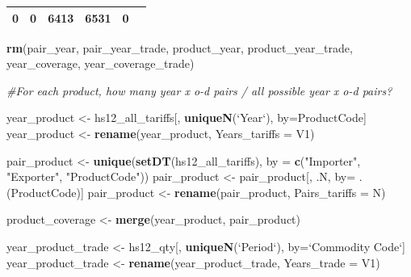 \documentclass[10pt,]{article}
\newenvironment{Shaded}{\begin{snugshade}}{\end{snugshade}}
\newcommand{\KeywordTok}[1]{\textcolor[rgb]{0.13,0.29,0.53}{\textbf{{#1}}}}
\newcommand{\DataTypeTok}[1]{\textcolor[rgb]{0.13,0.29,0.53}{{#1}}}
\newcommand{\StringTok}[1]{\textcolor[rgb]{0.31,0.60,0.02}{{#1}}}
\newcommand{\CommentTok}[1]{\textcolor[rgb]{0.56,0.35,0.01}{\textit{{#1}}}}
\newcommand{\NormalTok}[1]{{#1}}
\begin{document}
\begin{longtable}[]{@{}cccccc@{}}
\begin{minipage}[t]{0.19\columnwidth}
0\strut
\end{minipage} & \begin{minipage}[t]{0.16\columnwidth}\centering\strut
0\strut
\end{minipage} & \begin{minipage}[t]{0.17\columnwidth}\centering\strut
6413\strut
\end{minipage} & \begin{minipage}[t]{0.14\columnwidth}\centering\strut
6531\strut
\end{minipage} & \begin{minipage}[t]{0.10\columnwidth}\centering\strut
0\strut
\end{minipage}\tabularnewline
\bottomrule
\end{longtable}

\begin{Shaded}
\begin{Highlighting}[]
\KeywordTok{rm}\NormalTok{(pair_year, pair_year_trade, product_year, product_year_trade, year_coverage, year_coverage_trade)}

\CommentTok{#For each product, how many year x o-d pairs / all possible year x o-d pairs?}

\NormalTok{year_product <-}\StringTok{ }\NormalTok{hs12_all_tariffs[, }\KeywordTok{uniqueN}\NormalTok{(}\StringTok{`}\DataTypeTok{Year}\StringTok{`}\NormalTok{), by=ProductCode]}
\NormalTok{year_product <-}\StringTok{ }\KeywordTok{rename}\NormalTok{(year_product, }\DataTypeTok{Years_tariffs =} \NormalTok{V1)}

\NormalTok{pair_product <-}\StringTok{ }\KeywordTok{unique}\NormalTok{(}\KeywordTok{setDT}\NormalTok{(hs12_all_tariffs), }\DataTypeTok{by =} \KeywordTok{c}\NormalTok{(}\StringTok{"Importer"}\NormalTok{, }\StringTok{"Exporter"}\NormalTok{, }\StringTok{"ProductCode"}\NormalTok{))}
\NormalTok{pair_product <-}\StringTok{ }\NormalTok{pair_product[, .N, by=}\StringTok{ }\NormalTok{.(ProductCode)]}
\NormalTok{pair_product <-}\StringTok{ }\KeywordTok{rename}\NormalTok{(pair_product, }\DataTypeTok{Pairs_tariffs =} \NormalTok{N)}

\NormalTok{product_coverage <-}\StringTok{ }\KeywordTok{merge}\NormalTok{(year_product, pair_product)}

\NormalTok{year_product_trade <-}\StringTok{ }\NormalTok{hs12_qty[, }\KeywordTok{uniqueN}\NormalTok{(}\StringTok{`}\DataTypeTok{Period}\StringTok{`}\NormalTok{), by=}\StringTok{`}\DataTypeTok{Commodity Code}\StringTok{`}\NormalTok{]}
\NormalTok{year_product_trade <-}\StringTok{ }\KeywordTok{rename}\NormalTok{(year_product_trade, }\DataTypeTok{Years_trade =} \NormalTok{V1)}


\end{Highlighting}
\end{Shaded}
\end{document}
